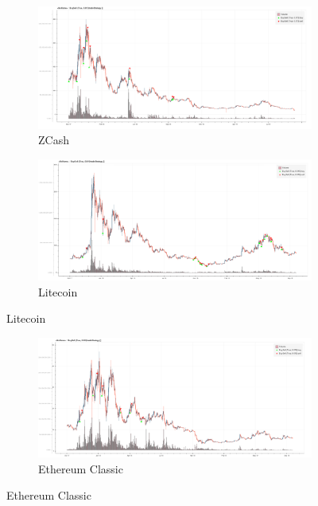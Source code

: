 \documentclass[letterpaper]{article}
\begin{document}
\begin{figure}[]\ContinuedFloat
    \centering
    \begin{subfigure}[b]{1\linewidth}
      \includegraphics[width=\linewidth]{images/backtest/ZEC.png}
      \caption{ZCash}
      \label{fig:zcash}
    \end{subfigure}
    \begin{subfigure}[b]{1\linewidth}
      \includegraphics[width=\linewidth]{images/backtest/LTC.png}
      \caption{Litecoin}  
      \label{fig:litecoin}
    \end{subfigure}
    \newpage
\end{figure}
\begin{figure}[]\ContinuedFloat
    \centering
    \begin{subfigure}[b]{1\linewidth}
      \includegraphics[width=\linewidth]{images/backtest/ETC.png}
      \caption{Ethereum Classic}
      \label{fig:etc}
    \end{subfigure}
\end{figure}
\end{document}
